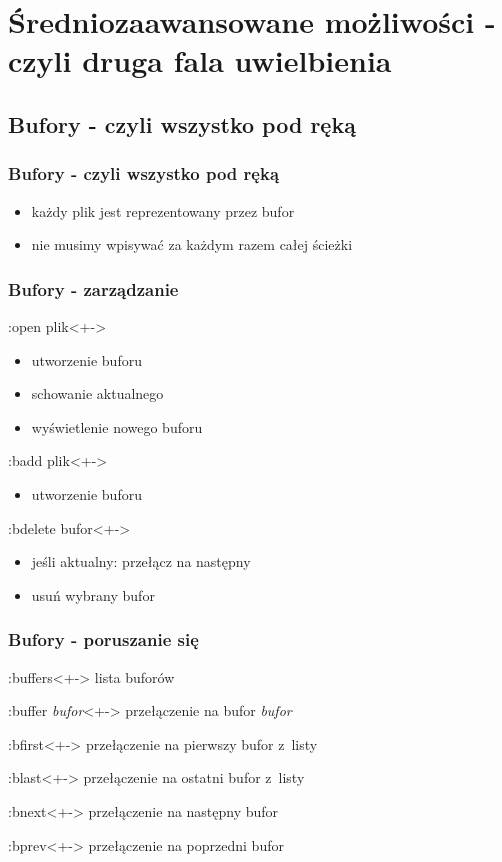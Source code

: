 \documentclass{beamer}
\begin{document}
\section{Średniozaawansowane możliwości - czyli druga fala uwielbienia}
\subsection{Bufory - czyli wszystko pod ręką}
\begin{frame}
	\frametitle{Bufory - czyli wszystko pod ręką}
	\begin{itemize}[<+->]
		\item każdy plik jest reprezentowany przez bufor
		\item nie musimy wpisywać za każdym razem całej ścieżki
	\end{itemize}
\end{frame}
\begin{frame}
	\frametitle{Bufory - zarządzanie}
	\begin{block}{:open plik}<+->
		\begin{itemize}
			\item utworzenie buforu
			\item schowanie aktualnego
			\item wyświetlenie nowego buforu
		\end{itemize}
	\end{block}
	\begin{block}{:badd plik}<+->
		\begin{itemize}
			\item utworzenie buforu
		\end{itemize}
	\end{block}
	\begin{block}{:bdelete bufor}<+->
		\begin{itemize}
			\item jeśli aktualny: przełącz na następny
			\item usuń wybrany bufor
		\end{itemize}
	\end{block}
\end{frame}
\begin{frame}
	\frametitle{Bufory - poruszanie się}
	\begin{block}{:buffers}<+->
		lista buforów
	\end{block}
	\begin{block}{:buffer \textit{bufor}}<+->
		przełączenie na bufor \textit{bufor}
	\end{block}
	\begin{block}{:bfirst}<+->
		przełączenie na pierwszy bufor z~listy
	\end{block}
	\begin{block}{:blast}<+->
		przełączenie na ostatni bufor z~listy
	\end{block}
\end{frame}
\begin{frame}
	\begin{block}{:bnext}<+->
		przełączenie na następny bufor
	\end{block}
	\begin{block}{:bprev}<+->
		przełączenie na poprzedni bufor
	\end{block}
\end{frame}
\end{document}

